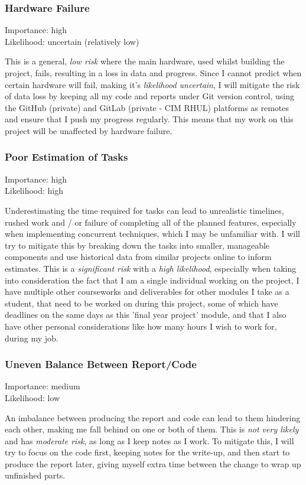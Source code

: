 \documentclass[]{project_plan}
\begin{document}
\newpage

\subsubsection{Hardware Failure}
Importance: high\\
Likelihood: uncertain (relatively low)

This is a general, \textit{low risk} where the main hardware, used whilst building the project, fails,
resulting in a loss in data and progress. Since I cannot predict when certain hardware will fail, making
it's \textit{likelihood uncertain}, I will mitigate the risk of data loss by keeping all my code and reports
under Git version control, using the GitHub (private) and GitLab (private - CIM RHUL) platforms as
remotes and ensure that I push my progress regularly. This means that my work on this project will
be unaffected by hardware failure.

\subsubsection{Poor Estimation of Tasks}
Importance: high\\
Likelihood: high

Underestimating the time required for tasks can lead to unrealistic timelines, rushed work and / or failure of
completing all of the planned features, especially when implementing concurrent techniques, which I may
be unfamiliar with. I will try to mitigate this by breaking down the tasks into smaller, manageable components
and use historical data from similar projects online to inform estimates. This is a \textit{significant risk} with
a \textit{high likelihood}, especially when taking into consideration the fact that I am a single individual working
on the project, I have multiple other courseworks and deliverables for other modules I take as a student,
that need to be worked on during this project, some of which have deadlines on the same days as this
'final year project' module, and that I also have other personal considerations like how many hours
I wish to work for, during my job.

\subsubsection{Uneven Balance Between Report/Code}
Importance: medium\\
Likelihood: low

An imbalance between producing the report and code can lead to them hindering each other, making me fall behind
on one or both of them. This is \textit{not very likely} and has \textit{moderate risk}, as long as I keep notes as I work. To
mitigate this, I will try to focus on the code first, keeping notes for the write-up, and then start to produce
the report later, giving myself extra time between the change to wrap up unfinished parts.
\end{document}
